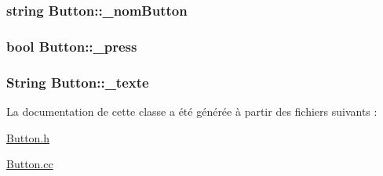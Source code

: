 \label{classButton_a751676486a9616cf332d65a8c711f1b7}
\hypertarget{classButton_a1006e4177632505c56e428824c850a3c}{
\subsubsection[{\_\-nomButton}]{\setlength{\rightskip}{0pt plus 5cm}string {\bf Button::\_\-nomButton}}}
\label{classButton_a1006e4177632505c56e428824c850a3c}
\hypertarget{classButton_ae48176d495e9b1743b044065962b2967}{
\subsubsection[{\_\-press}]{\setlength{\rightskip}{0pt plus 5cm}bool {\bf Button::\_\-press}}}
\label{classButton_ae48176d495e9b1743b044065962b2967}
\hypertarget{classButton_a946677c81cb01eeec9fd0f94595d47a3}{
\subsubsection[{\_\-texte}]{\setlength{\rightskip}{0pt plus 5cm}String {\bf Button::\_\-texte}}}
\label{classButton_a946677c81cb01eeec9fd0f94595d47a3}


La documentation de cette classe a été générée à partir des fichiers suivants :\begin{DoxyCompactItemize}
\item 
\hyperlink{Button_8h}{Button.h}\item 
\hyperlink{Button_8cc}{Button.cc}\end{DoxyCompactItemize}
